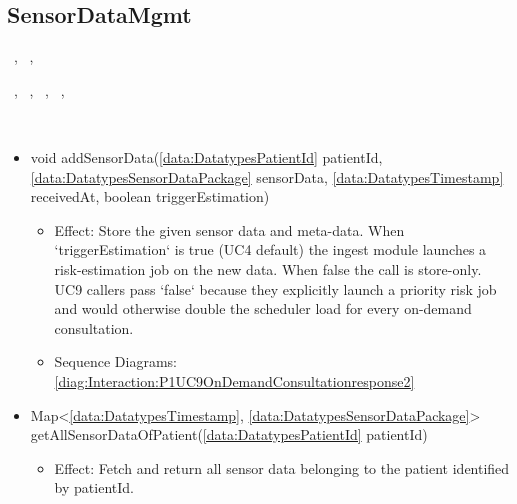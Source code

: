   \subsection{SensorDataMgmt}\label{int:InterfacesSensorDataMgmt}
    \begin{description}
      \item[Provided by:] \iconcomponent{}~, \iconcomponent{}~, \iconcomponent{}~
      \item[Required by:] \iconcomponent{}~, \iconcomponent{}~, \iconcomponent{}~, \iconcomponent{}~, \iconcomponent{}~ 
      \item[Operations:] ~
    \begin{itemize}[noitemsep,nolistsep,leftmargin=-.25cm]
      \item \textsf{void addSensorData(\ref{data:DatatypesPatientId} patientId, \ref{data:DatatypesSensorDataPackage} sensorData, \ref{data:DatatypesTimestamp} receivedAt, boolean triggerEstimation)}
        \begin{itemize}[noitemsep,nolistsep]
           \item Effect: Store the given sensor data and meta-data. When `triggerEstimation` is true (UC4 default) the ingest module launches a risk-estimation job on the new data. When false the call is store-only. UC9 callers pass `false` because they explicitly launch a priority risk job and would otherwise double the scheduler load for every on-demand consultation. 
           \item Sequence Diagrams: \cref{diag:Interaction:P1UC9OnDemandConsultationresponse2}
        \end{itemize}
      \item \textsf{Map\textless{}\ref{data:DatatypesTimestamp}, \ref{data:DatatypesSensorDataPackage}\textgreater{} getAllSensorDataOfPatient(\ref{data:DatatypesPatientId} patientId)}
        \begin{itemize}[noitemsep,nolistsep]
           \item Effect: Fetch and return all sensor data belonging to the patient identified by patientId. 

\end{itemize}
\end{itemize}
\end{description}
